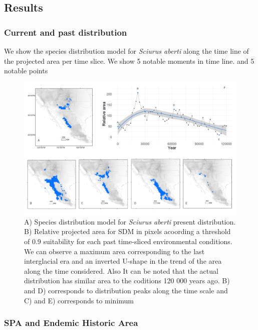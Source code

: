 \documentclass[
]{article}
\begin{document}
\hypertarget{results}{%
\subsection{Results}\label{results}}

\hypertarget{current-and-past-distribution}{%
\subsubsection{Current and past
distribution}\label{current-and-past-distribution}}

We show the species distribution model for \emph{Sciurus aberti} along
the time line of the projected area per time slice. We show 5 notable
moments in time line. and 5 notable points

\begin{figure}
\centering
\includegraphics[width=1\textwidth,height=\textheight]{all_figures/figure_3.png}
\caption{A) Species distribution model for \emph{Sciurus aberti} present
distribution. B) Relative projected area for SDM in pixels acoording a
threshold of 0.9 suitability for each past time-sliced environmental
conditions. We can observe a maximum area corresponding to the last
interglacial era and an inverted U-shape in the trend of the area along
the time considered. Also It can be noted that the actual distribution
has similar area to the coditions 120 000 years ago. B) and D)
corresponds to distribution peaks along the time scale and C) and E)
corresponds to minimum}
\end{figure}

\hypertarget{spa-and-endemic-historic-area}{%
\subsubsection{SPA and Endemic Historic
Area}\label{spa-and-endemic-historic-area}}
\end{document}
